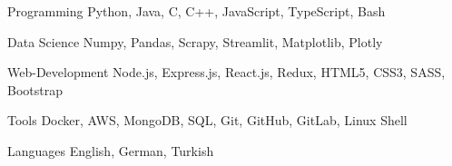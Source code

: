 
\begin{cvskills}

  \cvskill
    {Programming}
    {Python, Java, C, C++, JavaScript, TypeScript, Bash}

  \cvskill
    {Data Science}
    {Numpy, Pandas, Scrapy, Streamlit, Matplotlib, Plotly}

  \cvskill
    {Web-Development}
    {Node.js, Express.js, React.js, Redux, HTML5, CSS3, SASS, Bootstrap}

  \cvskill
    {Tools}
    {Docker, AWS, MongoDB, SQL, Git, GitHub, GitLab, Linux Shell}

  \cvskill
    {Languages}
    {English, German, Turkish}

\end{cvskills}
